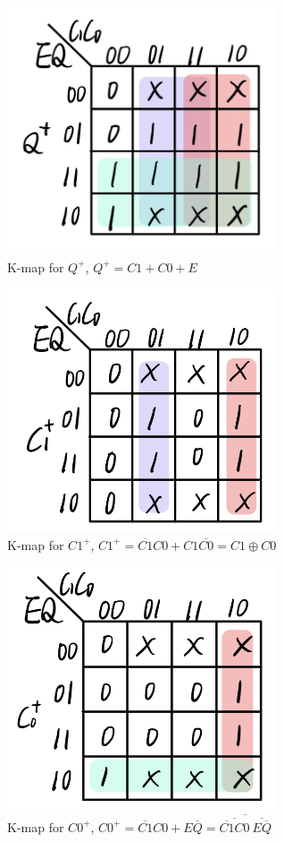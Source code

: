 \documentclass[12pt]{article}
\begin{document}
\begin{figure}[H]
    \centering
    \includegraphics[width=8cm]{Q+.png}
    \caption{K-map for $Q^+$, $Q^+=C1+C0+E$}
\end{figure}
\begin{figure}[H]
    \centering
    \includegraphics[width=8cm]{C1+.png}
    \caption{K-map for $C1^+$, $C1^+=\overline{C1}C0+C1\overline{C0}=C1 \oplus C0$}
\end{figure}
\begin{figure}[H]
    \centering
    \includegraphics[width=8cm]{C0+.png}
    \caption{K-map for $C0^+$, $C0^+=\overline{C1}C0+E\overline{Q}=\overline{\overline{\overline{C1}C0}\ \overline{E\overline{Q}}}$}
\end{figure}
\end{document}
